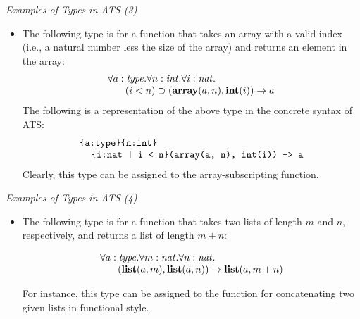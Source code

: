 \documentclass[pdf]{prosper}
\def\sint{{\it int}}
\def\snat{{\it nat}}
\def\stype{{\it type}}
\def\tint{\mbox{\bf int}}
\def\tlist{\mbox{\bf list}}
\def\tarray{\mbox{\bf array}}
\def\Bimp{\supset}
\def\timp{\rightarrow}
\begin{document}
\begin{slide}{\em Examples of Types in ATS (3)}
\begin{itemize}
\item

The following type is for a function that takes an array with a valid index
(i.e., a natural number less the size of the array) and returns an element
in the array:
$$\begin{array}{l}
\forall a:\stype.\forall n:\sint.\forall i:\snat.~\\
\kern18pt(i<n)\Bimp(\tarray(a, n), \tint(i)) \timp a \\
\end{array}$$
The following is a representation of the above type in the concrete syntax
of ATS:
$$\begin{array}{l}
\texttt{\{a:type\}\{n:int\}}\\
\kern12pt\texttt{\{i:nat | i < n\}(array(a, n), int(i)) -> a}\\
\end{array}$$
Clearly, this type can be assigned to the array-subscripting
function.

\end{itemize}
\end{slide}
\begin{slide}{\em Examples of Types in ATS (4)}
\begin{itemize}
\item

The following type is for a function that takes two lists of length $m$ and
$n$, respectively, and returns a list of length $m+n$:

$$\begin{array}{l}
\forall a:\stype.\forall m:\snat.\forall n:\snat.~\\
\kern18pt(\tlist(a, m), \tlist(a, n)) \timp \tlist(a, m+n)\\
\end{array}$$

For instance, this type can be assigned to the function for concatenating
two given lists in functional style.

\end{itemize}
\end{slide}
\end{document}
